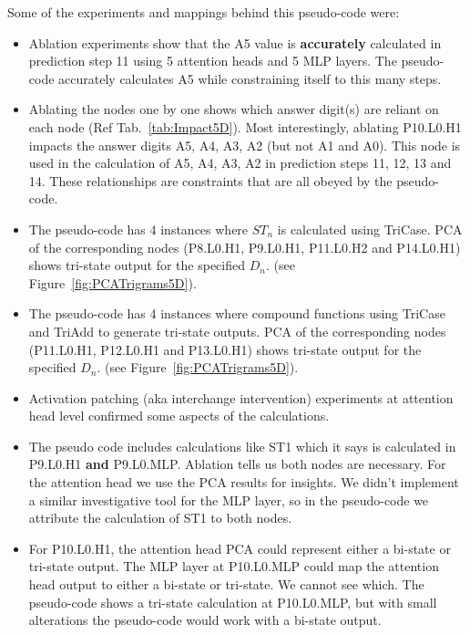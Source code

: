 \documentclass[11pt]{article}
\newcommand{\DN}{$D_{n}$}
\newcommand{\ANST}{$ST_{n}$ }
\begin{document}
Some of the experiments and mappings behind this pseudo-code were:

\begin{itemize}
\item Ablation experiments show that the A5 value is \textbf{accurately} calculated in prediction step 11 using 5 attention heads and 5 MLP layers. The pseudo-code accurately calculates A5 while constraining itself to this many steps.

\item Ablating the nodes one by one shows which answer digit(s) are reliant on each node (Ref Tab.~\ref{tab:Impact5D}). Most interestingly, ablating P10.L0.H1 impacts the answer digits A5, A4, A3, A2 (but not A1 and A0). This node is used in the calculation of A5, A4, A3, A2 in prediction steps 11, 12, 13 and 14. These relationships are constraints that are all obeyed by the pseudo-code. 

\item The pseudo-code has 4 instances where \ANST is calculated using TriCase. PCA of the corresponding nodes (P8.L0.H1, P9.L0.H1, P11.L0.H2 and P14.L0.H1) shows tri-state output for the specified \DN . (see Figure~\ref{fig:PCATrigrams5D}).

\item The pseudo-code has 4 instances where compound functions using TriCase and TriAdd to generate tri-state outputs. PCA of the corresponding nodes (P11.L0.H1, P12.L0.H1 and P13.L0.H1) shows tri-state output for the specified \DN . (see Figure~\ref{fig:PCATrigrams5D}).

\item Activation patching (aka interchange intervention) experiments at attention head level confirmed some aspects of the calculations.

\item The pseudo code includes calculations like ST1 which it says is calculated in P9.L0.H1 \textbf{and} P9.L0.MLP. Ablation tells us both nodes are necessary. For the attention head we use the PCA results for insights. We didn't implement a similar investigative tool for the MLP layer, so in the pseudo-code we attribute the calculation of ST1 to both nodes.

\item For P10.L0.H1, the attention head PCA could represent either a bi-state or tri-state output. The MLP layer at P10.L0.MLP could map the attention head output to either a bi-state or tri-state. We cannot see which. The pseudo-code shows a tri-state calculation at P10.L0.MLP, but with small alterations the pseudo-code would work with a bi-state output.


\end{itemize}
\end{document}

